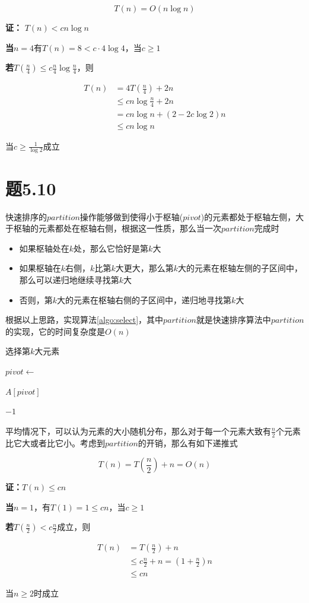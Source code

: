 \documentclass[a4paper,twoside]{article}
\begin{document}
\begin{spacing}{1.2}
$$
T(n)=O(n\log n)
$$

\textbf{证：} $T(n)<cn\log n$

\textbf{当$n=4$}有$T(n)=8<c\cdot4\log 4$，当$c\ge 1$

\textbf{若}$T(\frac{n}{4})\le c\frac{n}{4}\log \frac{n}{4}$，则

\begin{align*}
	T(n)&=4T(\frac{n}{4})+2n \\
	&\le cn\log \frac{n}{4}+2n \\
	&=cn\log n+(2-2c\log 2)n \\
	&\le cn\log n
\end{align*}

当$c\ge \frac{1}{\log 2}$成立

\section{题5.10}

快速排序的$partition$操作能够做到使得小于枢轴($pivot$)的元素都处于枢轴左侧，大于枢轴的元素都处在枢轴右侧，根据这一性质，那么当一次$partition$完成时

\begin{itemize}
	\item 如果枢轴处在$k$处，那么它恰好是第$k$大
	\item 如果枢轴在$k$右侧，$k$比第$k$大更大，那么第$k$大的元素在枢轴左侧的子区间中，那么可以递归地继续寻找第$k$大
	\item 否则，第$k$大的元素在枢轴右侧的子区间中，递归地寻找第$k$大
\end{itemize}

根据以上思路，实现算法\ref{algo:select}，其中$partition$就是快速排序算法中$partition$的实现，它的时间复杂度是$O(n)$

\begin{algorithm}
\caption{选择第$k$大元素}
\label{algo:select}
\begin{algorithmic}[1]
	
	\State $pivot \gets $ 
	
	\State \Return $A[pivot]$
	\State \Return {}
	\Else
	\State \Return {}
	\EndIf
	
	\State \Return $-1$
	\EndProcedure
\end{algorithmic}
\end{algorithm}

平均情况下，可以认为元素的大小随机分布，那么对于每一个元素大致有$\frac{n}{2}$个元素比它大或者比它小。考虑到$partition$的开销，那么有如下递推式

$$
T(n)=T(\frac{n}{2})+n=O(n)
$$

\textbf{证：}$T(n) \le cn$

\textbf{当}$n=1$，有$T(1)=1\le cn$，当$c\ge 1$

\textbf{若}$T(\frac{n}{2})<c\frac{n}{2}$成立，则

\begin{align*}
	T(n)&=T(\frac{n}{2})+n\\
	&\le c\frac{n}{2}+n =(1+\frac{n}{2})n \\
	&\le cn
\end{align*}

当$n\ge 2$时成立

\end{spacing}
\end{document}
